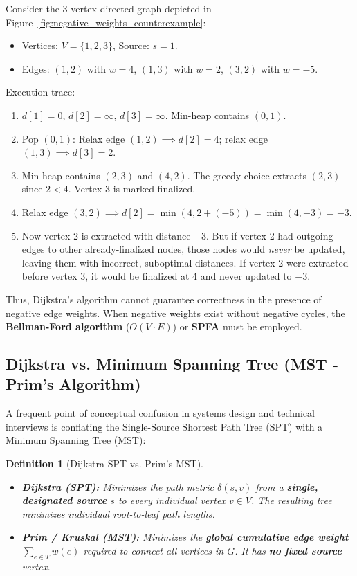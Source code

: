\documentclass[10pt,journal,compsoc,onecolumn]{IEEEtran}
\newtheorem{definition}[theorem]{Definition}
\begin{document}
Consider the 3-vertex directed graph depicted in Figure~\ref{fig:negative_weights_counterexample}:
\begin{itemize}
    \item Vertices: $V = \{1, 2, 3\}$, Source: $s = 1$.
    \item Edges: $(1, 2)$ with $w=4$, $(1, 3)$ with $w=2$, $(3, 2)$ with $w=-5$.
\end{itemize}
Execution trace:
\begin{enumerate}
    \item $d[1] = 0$, $d[2] = \infty$, $d[3] = \infty$. Min-heap contains $(0, 1)$.
    \item Pop $(0, 1)$: Relax edge $(1, 2) \implies d[2] = 4$; relax edge $(1, 3) \implies d[3] = 2$.
    \item Min-heap contains $(2, 3)$ and $(4, 2)$. The greedy choice extracts $(2, 3)$ since $2 < 4$. Vertex 3 is marked finalized.
    \item Relax edge $(3, 2) \implies d[2] = \min(4, 2 + (-5)) = \min(4, -3) = -3$.
    \item Now vertex 2 is extracted with distance $-3$. But if vertex 2 had outgoing edges to other already-finalized nodes, those nodes would \emph{never} be updated, leaving them with incorrect, suboptimal distances. If vertex 2 were extracted before vertex 3, it would be finalized at 4 and never updated to $-3$.
\end{enumerate}
Thus, Dijkstra's algorithm cannot guarantee correctness in the presence of negative edge weights. When negative weights exist without negative cycles, the \textbf{Bellman-Ford algorithm} ($O(V \cdot E)$) or \textbf{SPFA} must be employed.

\subsection{Dijkstra vs. Minimum Spanning Tree (MST - Prim's Algorithm)}
A frequent point of conceptual confusion in systems design and technical interviews is conflating the Single-Source Shortest Path Tree (SPT) with a Minimum Spanning Tree (MST):

\begin{definition}[Dijkstra SPT vs. Prim's MST]
\begin{itemize}
    \item \textbf{Dijkstra (SPT):} Minimizes the path metric $\delta(s, v)$ from a \textbf{single, designated source} $s$ to every individual vertex $v \in V$. The resulting tree minimizes individual root-to-leaf path lengths.
    \item \textbf{Prim / Kruskal (MST):} Minimizes the \textbf{global cumulative edge weight} $\sum_{e \in T} w(e)$ required to connect all vertices in $G$. It has \textbf{no fixed source} vertex.
\end{itemize}
\end{definition}
\end{document}
